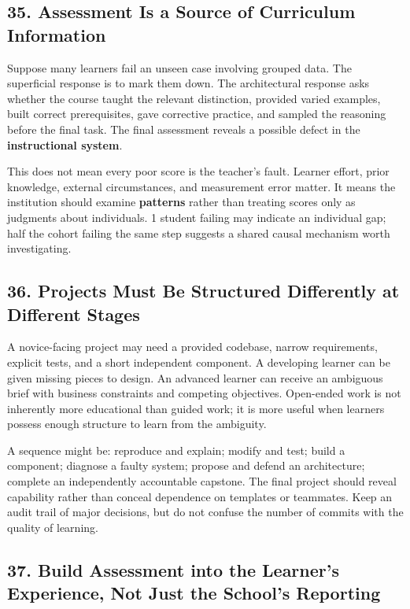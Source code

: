 \subsection*{35. Assessment Is a Source of Curriculum Information}

Suppose many learners fail an unseen case involving grouped data. The superficial response is to mark them down. The architectural response asks whether the course taught the relevant distinction, provided varied examples, built correct prerequisites, gave corrective practice, and sampled the reasoning before the final task. The final assessment reveals a possible defect in the \textbf{instructional system}.

This does not mean every poor score is the teacher's fault. Learner effort, prior knowledge, external circumstances, and measurement error matter. It means the institution should examine \textbf{patterns} rather than treating scores only as judgments about individuals. 1 student failing may indicate an individual gap; half the cohort failing the same step suggests a shared causal mechanism worth investigating.

\subsection*{36. Projects Must Be Structured Differently at Different Stages}

A novice-facing project may need a provided codebase, narrow requirements, explicit tests, and a short independent component. A developing learner can be given missing pieces to design. An advanced learner can receive an ambiguous brief with business constraints and competing objectives. Open-ended work is not inherently more educational than guided work; it is more useful when learners possess enough structure to learn from the ambiguity.

A sequence might be: reproduce and explain; modify and test; build a component; diagnose a faulty system; propose and defend an architecture; complete an independently accountable capstone. The final project should reveal capability rather than conceal dependence on templates or teammates. Keep an audit trail of major decisions, but do not confuse the number of commits with the quality of learning.

\subsection*{37. Build Assessment into the Learner's Experience, Not Just the School's Reporting}

